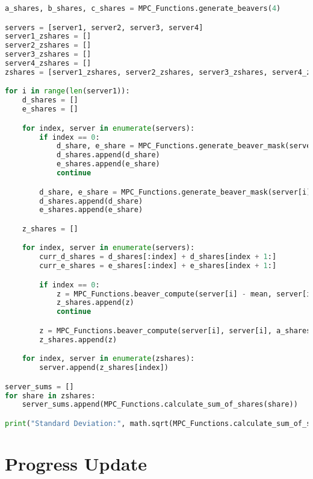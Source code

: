 \documentclass[conference]{IEEEtran}
\begin{document}
\begin{lstlisting}[language=Python, caption={Sample MPC Implementation Using Beaver's Triples}, label={lst:mpc_code}]
a_shares, b_shares, c_shares = MPC_Functions.generate_beavers(4)

servers = [server1, server2, server3, server4]
server1_zshares = []    
server2_zshares = []
server3_zshares = []
server4_zshares = []
zshares = [server1_zshares, server2_zshares, server3_zshares, server4_zshares]

for i in range(len(server1)):
    d_shares = []
    e_shares = []

    for index, server in enumerate(servers):
        if index == 0:
            d_share, e_share = MPC_Functions.generate_beaver_mask(server[i] - mean, server[i] - mean, a_shares[index], b_shares[index])
            d_shares.append(d_share)
            e_shares.append(e_share)
            continue

        d_share, e_share = MPC_Functions.generate_beaver_mask(server[i], server[i], a_shares[index], b_shares[index])
        d_shares.append(d_share)
        e_shares.append(e_share)

    z_shares = []

    for index, server in enumerate(servers):
        curr_d_shares = d_shares[:index] + d_shares[index + 1:]
        curr_e_shares = e_shares[:index] + e_shares[index + 1:]

        if index == 0:
            z = MPC_Functions.beaver_compute(server[i] - mean, server[i] - mean, a_shares[index], b_shares[index], c_shares[index], curr_d_shares, curr_e_shares, True)
            z_shares.append(z)
            continue

        z = MPC_Functions.beaver_compute(server[i], server[i], a_shares[index], b_shares[index], c_shares[index], curr_d_shares, curr_e_shares)
        z_shares.append(z)

    for index, server in enumerate(zshares):
        server.append(z_shares[index])

server_sums = []
for share in zshares:
    server_sums.append(MPC_Functions.calculate_sum_of_shares(share))

print("Standard Deviation:", math.sqrt(MPC_Functions.calculate_sum_of_shares(server_sums)/len(message_shares)))
\end{lstlisting}


\section{Progress Update}
\end{document}
